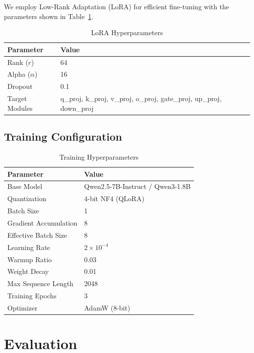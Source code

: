 \documentclass[11pt,a4paper]{article}
\begin{document}
We employ Low-Rank Adaptation (LoRA) for efficient fine-tuning with the parameters shown in Table~\ref{tab:lora}.

\begin{table}[htbp]
\centering
\caption{LoRA Hyperparameters}
\label{tab:lora}
\begin{tabular}{ll}
\toprule
\textbf{Parameter} & \textbf{Value} \\
\midrule
Rank ($r$) & 64 \\
Alpha ($\alpha$) & 16 \\
Dropout & 0.1 \\
Target Modules & q\_proj, k\_proj, v\_proj, o\_proj, gate\_proj, up\_proj, down\_proj \\
\bottomrule
\end{tabular}
\end{table}

\subsection{Training Configuration}

\begin{table}[htbp]
\centering
\caption{Training Hyperparameters}
\label{tab:training}
\begin{tabular}{ll}
\toprule
\textbf{Parameter} & \textbf{Value} \\
\midrule
Base Model & Qwen2.5-7B-Instruct / Qwen3-1.8B \\
Quantization & 4-bit NF4 (QLoRA) \\
Batch Size & 1 \\
Gradient Accumulation & 8 \\
Effective Batch Size & 8 \\
Learning Rate & $2 \times 10^{-4}$ \\
Warmup Ratio & 0.03 \\
Weight Decay & 0.01 \\
Max Sequence Length & 2048 \\
Training Epochs & 3 \\
Optimizer & AdamW (8-bit) \\
\bottomrule
\end{tabular}
\end{table}

\section{Evaluation}\label{sec:evaluation}
\end{document}
